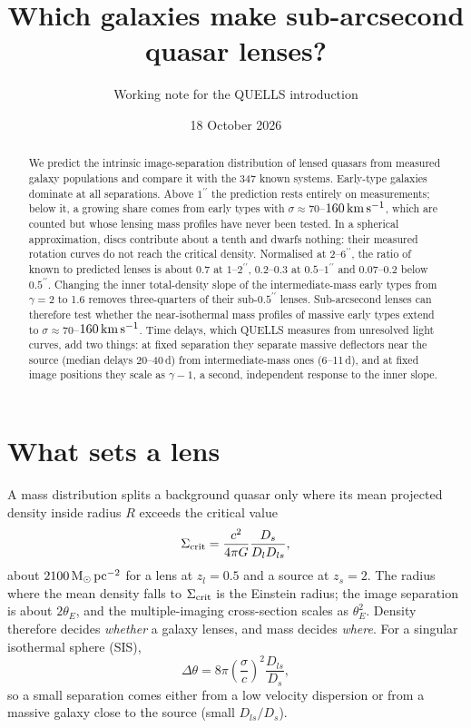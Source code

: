 \documentclass[11pt,a4paper]{article}
\title{Which galaxies make sub-arcsecond quasar lenses?}
\author{Working note for the QUELLS introduction}
\date{18 October 2026}
\newcommand{\scrit}{\Sigma_{\rm crit}}
\newcommand{\msun}{\mathrm{M}_\odot}
\newcommand{\arcsecond}{^{\prime\prime}}
\newcommand{\kms}{\,{\rm km\,s^{-1}}}
\begin{document}
\maketitle

\begin{abstract}
We predict the intrinsic image-separation distribution of lensed quasars from measured galaxy populations and compare it with the 347 known systems. Early-type galaxies dominate at all separations. Above $1\arcsecond$ the prediction rests entirely on measurements; below it, a growing share comes from early types with $\sigma\approx70$--$160\kms$, which are counted but whose lensing mass profiles have never been tested. In a spherical approximation, discs contribute about a tenth and dwarfs nothing: their measured rotation curves do not reach the critical density. Normalised at $2$--$6\arcsecond$, the ratio of known to predicted lenses is about 0.7 at $1$--$2\arcsecond$, 0.2--0.3 at $0.5$--$1\arcsecond$ and 0.07--0.2 below $0.5\arcsecond$. Changing the inner total-density slope of the intermediate-mass early types from $\gamma=2$ to 1.6 removes three-quarters of their sub-$0.5\arcsecond$ lenses. Sub-arcsecond lenses can therefore test whether the near-isothermal mass profiles of massive early types extend to $\sigma\approx70$--$160\kms$. Time delays, which QUELLS measures from unresolved light curves, add two things: at fixed separation they separate massive deflectors near the source (median delays 20--40\,d) from intermediate-mass ones (6--11\,d), and at fixed image positions they scale as $\gamma-1$, a second, independent response to the inner slope.
\end{abstract}

\section{What sets a lens}

A mass distribution splits a background quasar only where its mean projected density inside radius $R$ exceeds the critical value
\begin{equation}
\scrit=\frac{c^2}{4\pi G}\frac{D_s}{D_lD_{ls}},
\end{equation}
about $2100\,\msun\,{\rm pc^{-2}}$ for a lens at $z_l=0.5$ and a source at $z_s=2$. The radius where the mean density falls to $\scrit$ is the Einstein radius; the image separation is about $2\theta_E$, and the multiple-imaging cross-section scales as $\theta_E^2$. Density therefore decides \emph{whether} a galaxy lenses, and mass decides \emph{where}. For a singular isothermal sphere (SIS),
\begin{equation}
\Delta\theta=8\pi\left(\frac{\sigma}{c}\right)^2\frac{D_{ls}}{D_s},
\end{equation}
so a small separation comes either from a low velocity dispersion or from a massive galaxy close to the source (small $D_{ls}/D_s$).
\end{document}

